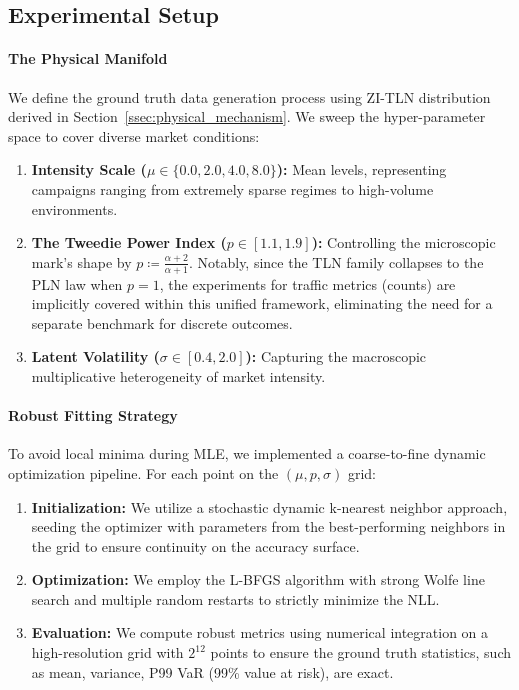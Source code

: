\documentclass[sigconf, anonymous, review]{acmart}
\begin{document}
\subsection{Experimental Setup}

\paragraph{The Physical Manifold}
We define the ground truth data generation process using ZI-TLN distribution derived in Section~\ref{ssec:physical_mechanism}. We sweep the hyper-parameter space to cover diverse market conditions:
\begin{enumerate}
    \item \textbf{Intensity Scale ($\mu \in \{0.0, 2.0, 4.0, 8.0\}$):} Mean levels, representing campaigns ranging from extremely sparse regimes to high-volume environments.
    \item \textbf{The Tweedie Power Index ($p \in [1.1, 1.9]$):} Controlling the microscopic mark's shape by $p \coloneqq \frac{\alpha+2}{\alpha+1}$. Notably, since the TLN family collapses to the PLN law when $p=1$, the experiments for traffic metrics (counts) are implicitly covered within this unified framework, eliminating the need for a separate benchmark for discrete outcomes.
    \item \textbf{Latent Volatility ($\sigma \in [0.4, 2.0]$):} Capturing the macroscopic multiplicative heterogeneity of market intensity.
\end{enumerate}

\paragraph{Robust Fitting Strategy}
To avoid local minima during MLE, we implemented a coarse-to-fine dynamic optimization pipeline. 
For each point on the $(\mu, p, \sigma)$ grid:
\begin{enumerate}
    \item \textbf{Initialization:} We utilize a stochastic dynamic k-nearest neighbor approach, seeding the optimizer with parameters from the best-performing neighbors in the grid to ensure continuity on the accuracy surface.
    \item \textbf{Optimization:} We employ the L-BFGS algorithm with strong Wolfe line search and multiple random restarts to strictly minimize the NLL.
    \item \textbf{Evaluation:} We compute robust metrics using numerical integration on a high-resolution grid with $2^{12}$ points to ensure the ground truth statistics, such as mean, variance, P99 VaR (99\% value at risk), are exact.
\end{enumerate}
\end{document}
